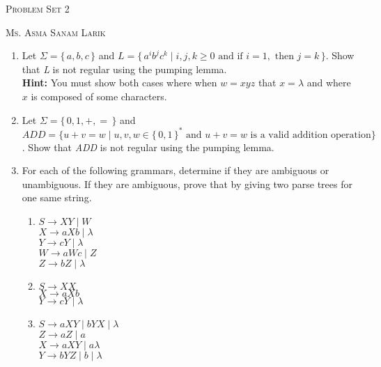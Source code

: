 \documentclass[11pt, article, oneside]{memoir}
\newcommand{\set}[1]{\{\, #1\, \}}
\begin{document}
\begin{center}
\LARGE{\textsc{Problem Set 2}}
 
\large{\textsc{Ms. Asma Sanam Larik}}
\end{center}

\begin{enumerate}
    \item
        Let \(\Sigma = \set{a, b, c}\) and \(L = \set{ {a^i}{b^j}{c^k} \mid i, j, k \ge 0 \text{ and if } i = 1,  \text{ then } j = k}\). Show that \textit{L} is not regular using the pumping lemma.
        \\\textbf{Hint:} You must show both cases where when \(w = xyz\) that \(x = \lambda\) and where \(x\) is composed of some characters.
        
    \item 
        Let \(\Sigma = \set{0, 1, +, =}\) and \(ADD = \{ u+v=w \mid u, v, w \in \set{0, 1}^* \text{ and } u+v=w \text{ is a valid addition operation}\}\). Show that \textit{ADD} is not regular using the pumping lemma.
        
    \item
        For each of the following grammars, determine if they are ambiguous or unambiguous. If they are ambiguous, prove that by giving two parse trees for one same string.
        \begin{enumerate}
            \item
                \(S \rightarrow XY \mid W \)
                \\\(X \rightarrow aXb \mid \lambda\)
                \\\(Y \rightarrow cY \mid \lambda\)
                \\\(W \rightarrow aWc \mid Z\)
                \\\(Z \rightarrow bZ \mid \lambda\)
            \item
                \(S \rightarrow XX \)
                \\\(X \rightarrow aXb\)
                \\\(Y \rightarrow cY \mid \lambda\)
            \item
                \(S \rightarrow aXY \mid bYX \mid \lambda \)
                \\\(Z \rightarrow aZ \mid a\)
                \\\(X \rightarrow aXY \mid a \lambda\)
                \\\(Y \rightarrow bYZ \mid b \mid \lambda\) 
        \end{enumerate}
        

\end{enumerate}
\end{document}

